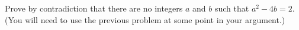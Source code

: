 Prove by contradiction that there are no integers $a$ and $b$ such that $a^2 - 4b = 2$. (You will need to use the previous problem at some point in your argument.)